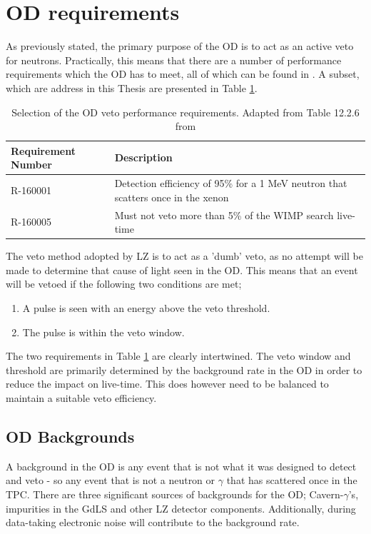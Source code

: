 \section{OD requirements}
\par
As previously stated, the primary purpose of the OD is to act as an active veto for neutrons.
Practically, this means that there are a number of performance requirements which the OD has to meet, all of which can be found in \cite{LZ_TechnicalDesignReview_ref}.
A subset, which are address in this Thesis are presented in Table \ref{tab:veto_requirements}.

\begin{table}[!htbp]
    \centering
    \begin{tabular}{p{}p{}} %
    \hline
    {Requirement Number} & {Description} \\ \hline
    R-160001             & Detection efficiency of 95\% for a 1 MeV neutron that scatters once in the xenon \\
    R-160005             & Must not veto more than 5\% of the WIMP search live-time
    \end{tabular}
    \caption{Selection of the OD veto performance requirements. Adapted from Table 12.2.6 from \cite{LZ_TechnicalDesignReview_ref}}
    \label{tab:veto_requirements}
\end{table} 

\par
The veto method adopted by LZ is to act as a 'dumb' veto, as no attempt will be made to determine that cause of light seen in the OD.
This means that an event will be vetoed if the following two conditions are met;
\begin{enumerate}
    \item A pulse is seen with an energy above the veto threshold.
    \item The pulse is within the veto window.
\end{enumerate}
The two requirements in Table \ref{tab:veto_requirements} are clearly intertwined.
The veto window and threshold are primarily determined by the background rate in the OD in order to reduce the impact on live-time.
This does however need to be balanced to maintain a suitable veto efficiency.

\subsection{OD Backgrounds}
\par
A background in the OD is any event that is not what it was designed to detect and veto - so any event that is not a neutron or $\gamma$ that has scattered once in the TPC.
There are three significant sources of backgrounds for the OD; Cavern-$\gamma$'s, impurities in the GdLS and other LZ detector components.
Additionally, during data-taking electronic noise will contribute to the background rate. 

